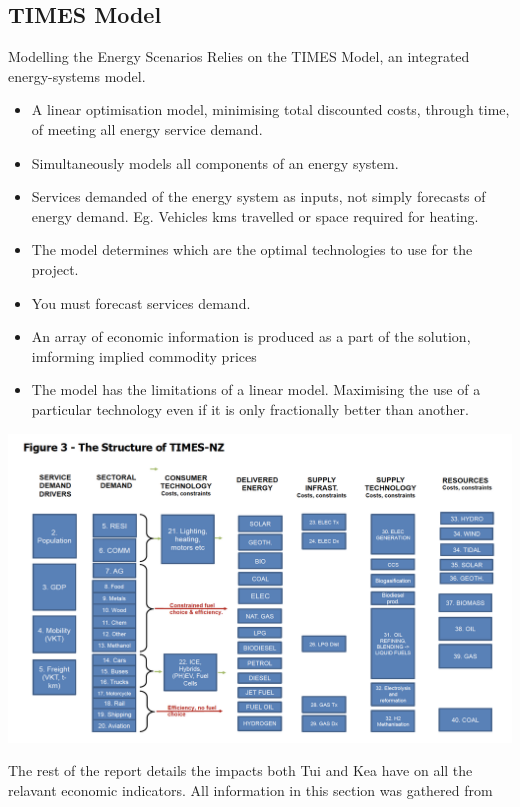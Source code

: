 \documentclass[12pt]{article}
\begin{document}
    \subsection{TIMES Model}
    Modelling the Energy Scenarios Relies on the TIMES Model, an integrated energy-systems model.
    \begin{itemize}
        \item A linear optimisation model, minimising total discounted costs, through time, of meeting all energy service demand.
        \item Simultaneously models all components of an energy system.
        \item Services demanded of the energy system as inputs, not simply forecasts of energy demand. Eg. Vehicles kms travelled or space required for heating.
        \item The model determines which are the optimal technologies to use for the project.
        \item You must forecast services demand.
        \item An array of economic information is produced as a part of the  solution, imforming implied commodity prices
        \item The model has the limitations of a linear model. Maximising the use of a particular technology even if it is only fractionally better than another.
    \end{itemize}
    \begin{center}
        \includegraphics[width=\textwidth]{TNZ}
        \vspace{-1cm}
    \end{center}
    The rest of the report details the impacts both Tui and Kea have on all the relavant economic indicators.
    All information in this section was gathered from 
\end{document}
